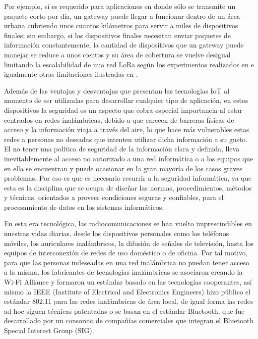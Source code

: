 Por ejemplo, si es requerido para aplicaciones en donde sólo se transmite un paquete corto por día, un gateway puede llegar a funcionar dentro de un área urbana cubriendo unos cuantos kilómetros para servir a miles de dispositivos finales; sin embargo, si los dispositivos finales necesitan enviar paquetes de información constantemente, la cantidad de dispositivos que un gateway puede manejar se reduce a unos cientos y su área de cobertura se vuelve desigual limitando la escalabilidad de una red LoRa según los experimentos realizados en \cite{Petajajarvi2017PerformanceCoverage} e igualmente otras limitaciones ilustradas en \cite{Adelantado2017UnderstandingLoRaWAN}. 

Además de las ventajas y desventajas que presentan las tecnologías IoT al momento de ser utilizadas para desarrollar cualquier tipo de aplicación, en estos dispositivos la seguridad es un aspecto que cobra especial importancia al estar centrados en redes inalámbricas, debido a que carecen de barreras físicas de acceso y la información viaja a través del aire, lo que hace más vulnerables estas redes a personas no deseadas que intenten utilizar dicha información a su gusto\cite{Chiu2006Seguridad802.11}. El no tener una política de seguridad de la información clara y definida, lleva inevitablemente al acceso no autorizado a una red informática o a los equipos que en ella se encuentran y puede ocasionar en la gran mayoría de los casos graves problemas. Por eso es que es necesario recurrir a la seguridad informática, ya que esta es la disciplina que se ocupa de diseñar las normas, procedimientos, métodos y técnicas, orientados a proveer condiciones seguras y confiables, para el procesamiento de datos en los sistemas informáticos\cite{AgudeloGonzalez2014ElBASC}.

En esta era tecnológica, las radiocomunicaciones se han vuelto imprescindibles en nuestras vidas diarias, desde los dispositivos personales como los teléfonos móviles, los auriculares inalámbricos, la difusión de señales de televisión, hasta los equipos de interconexión de redes de uso doméstico o de oficina. Por tal motivo, para que las personas indeseadas en una red inalámbrica no puedan tener acceso a la misma, los fabricantes de tecnologías inalámbricas se asociaron creando la Wi-Fi Alliance y formaron un estándar basado en las tecnologías cooperantes, así mismo la IEEE (Institute of Electrical and Electronics Engineers) hizo público el estándar 802.11 para las redes inalámbricas de área local\cite{RojasBautista2007SeguridadInalambricas}, de igual forma las redes ad hoc siguen técnicas patentadas o se basan en el estándar Bluetooth, que fue desarrollado por un consorcio de compañías comerciales que integran el Bluetooth Special Interest Group (SIG)\cite{Karygiannis2002WirelessSecurity}. 

